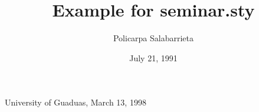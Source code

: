 %
%
%







\rotateheaderstrue          %


\title{Example for seminar.sty}
\author{Policarpa Salabarrieta}
\date{July 21, 1991}

\newcommand{\sref}[1]{SLIDE \ref{#1}}
\newcommand{\heading}[1]{\begin{center}\large\bf #1\end{center}}

%
  {University of Guaduas, March 13, 1998\hfil\thepage}{}
\pagestyle{MH}



